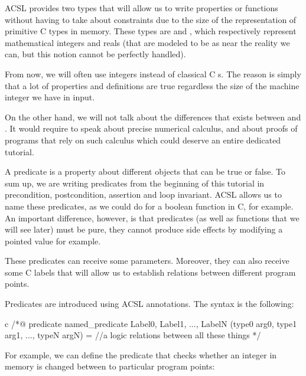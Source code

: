 \documentclass[middle]{zmdocument}
\begin{document}


ACSL provides two types that will allow us to write properties or
functions without having to take about constraints due to the size of
the representation of primitive C types in memory. These types are
 and , which respectively represent
mathematical integers and reals (that are modeled to be as near the
reality we can, but this notion cannot be perfectly handled).

From now, we will often use integers instead of classical C
s. The reason is simply that a lot of properties and
definitions are true regardless the size of the machine integer we have
in input.

On the other hand, we will not talk about the differences that exists
between  and . It would require to
speak about precise numerical calculus, and about proofs of programs
that rely on such calculus which could deserve an entire dedicated
tutorial.





A predicate is a property about different objects that can be true or
false. To sum up, we are writing predicates from the beginning of this
tutorial in precondition, postcondition, assertion and loop invariant.
ACSL allows us to name these predicates, as we could do for a boolean
function in C, for example. An important difference, however, is that
predicates (as well as functions that we will see later) must be pure,
they cannot produce side effects by modifying a pointed value for
example.

These predicates can receive some parameters. Moreover, they can also
receive some C labels that will allow us to establish relations between
different program points.





Predicates are introduced using ACSL annotations. The syntax is the
following:



\begin{CodeBlock}{c}
/*@
  predicate named_predicate { Label0, Label1, ..., LabelN }(type0 arg0, type1 arg1, ..., typeN argN) =
    //a logic relations between all these things
*/
\end{CodeBlock}



For example, we can define the predicate that checks whether an integer
in memory is changed between to particular program points:
\end{document}
